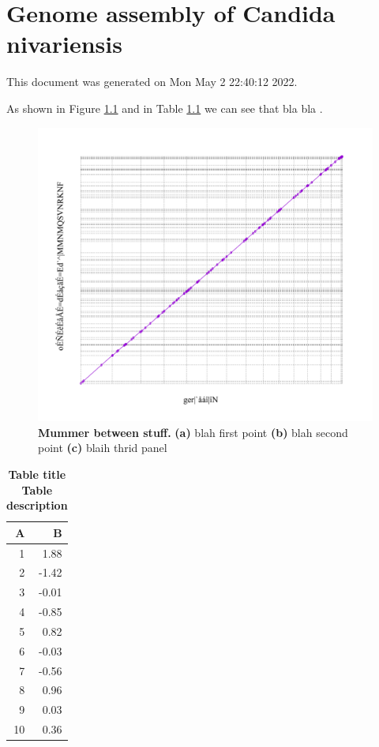 \chapter{Genome assembly of Candida nivariensis}
\label{chap:nivar}





This document was generated on Mon May  2 22:40:12 2022.

As shown in Figure \ref{fig:mummer} and in Table \ref{tab:rtab1} we can see that bla bla \citep{B}.


\begin{figure}[!ht]
\centering
\includegraphics[width = 1\linewidth,keepaspectratio]{figure/mummer.pdf}
\caption[Mummer between stuff]{{\bf Mummer between stuff.} {\bf (a)} blah first point {\bf (b)} blah second point {\bf (c)} blaih thrid panel  }
\label{fig:mummer}
\end{figure}




\begin{table}[ht]
\centering
\begin{tabular}{rr}
  \hline
A & B \\ 
  \hline
  1 & 1.88 \\ 
    2 & -1.42 \\ 
    3 & -0.01 \\ 
    4 & -0.85 \\ 
    5 & 0.82 \\ 
    6 & -0.03 \\ 
    7 & -0.56 \\ 
    8 & 0.96 \\ 
    9 & 0.03 \\ 
   10 & 0.36 \\ 
   \hline
\end{tabular}
\caption{\bf{ Table title } Table description} 
\label{tab:rtab1}
\end{table}

